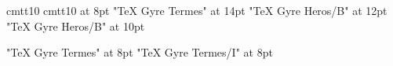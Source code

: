 




\font\tentt cmtt10
\def\visiblespace{\relax\char`\ }
\font\eighttt cmtt10 at 8pt
\font\fourteenrm "TeX Gyre Termes" at 14pt
\font\twelvebf "TeX Gyre Heros/B" at 12pt
\font\tensansbf "TeX Gyre Heros/B" at 10pt


\font\eightrm "TeX Gyre Termes" at 8pt
\font\eightit "TeX Gyre Termes/I" at 8pt

\def\titlefont{\fourteenrm \baselineskip=16.8pt \relax}

\def\chapterfont{\twelvebf
  \baselineskip 14.4pt \relax}

\def\sectionfont{\tensansbf}

\def\eightfont{\eightrm
  \let\it\eightit
  \let\tt\eighttt
  \baselineskip 9.6pt \relax}

\def\footnotehook{\eightfont}
